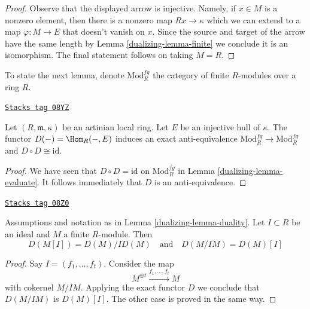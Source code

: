 \begin{proof}

Observe that the displayed arrow is injective. Namely, if $x \in M$ is
a nonzero element, then there is a nonzero map $Rx \to \kappa$ which
we can extend to a map $\varphi : M \to E$ that doesn't vanish on $x$.
Since the source and target of the arrow have the same length by
Lemma \ref{dualizing-lemma-finite}
we conclude it is an isomorphism. The final statement follows
on taking $M = R$.
\end{proof}

To state the next lemma, denote $\text{Mod}^{fg}_R$ the category of finite
$R$-modules over a ring $R$.

\begin{lemma}[Duality]
\label{dualizing-lemma-duality}
\href{https://stacks.math.columbia.edu/tag/08YZ}{\texttt{Stacks tag 08YZ}}

Let $(R, \mathfrak m, \kappa)$ be an artinian local ring.
Let $E$ be an injective hull of $\kappa$.
The functor $D(-) = \Hom_R(-, E)$ induces an exact anti-equivalence
$\text{Mod}^{fg}_R \to \text{Mod}^{fg}_R$ and
$D \circ D \cong \text{id}$.
\end{lemma}

\begin{proof}

We have seen that $D \circ D = \text{id}$ on $\text{Mod}^{fg}_R$
in Lemma \ref{dualizing-lemma-evaluate}. It follows immediately that
$D$ is an anti-equivalence.
\end{proof}

\begin{lemma}
\label{dualizing-lemma-duality-torsion-cotorsion}
\href{https://stacks.math.columbia.edu/tag/08Z0}{\texttt{Stacks tag 08Z0}}

Assumptions and notation as in Lemma \ref{dualizing-lemma-duality}.
Let $I \subset R$ be an ideal and $M$ a finite $R$-module.
Then
$$
D(M[I]) = D(M)/ID(M) \quad\text{and}\quad D(M/IM) = D(M)[I]
$$
\end{lemma}

\begin{proof}
Say $I = (f_1, \ldots, f_t)$. Consider the map
$$
M^{\oplus t} \xrightarrow{f_1, \ldots, f_t} M
$$
with cokernel $M/IM$. Applying the exact functor $D$ we conclude that
$D(M/IM)$ is $D(M)[I]$. The other case is proved in the same way.
\end{proof}

